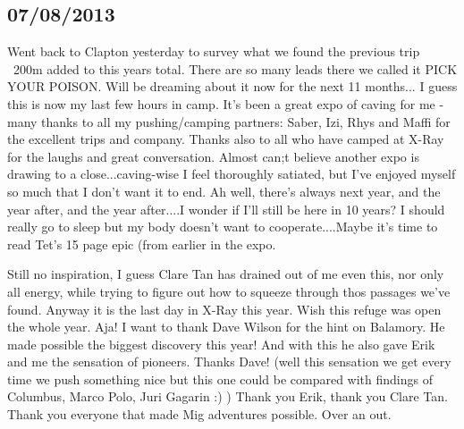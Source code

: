 
\subsection{07/08/2013}
Went back to Clapton yesterday to survey what we found the previous trip ~200m added to this years total. There are so many leads there we called it PICK YOUR POISON. Will be dreaming about it now for the next 11 months...
I guess this is now my last few hours in camp. It’s been a great expo of caving for me - many thanks to all my pushing/camping partners: Saber, Izi, Rhys and Maffi for the excellent trips and company. Thanks also to all who have camped at X-Ray for the laughs and great conversation.
Almost can;t believe another expo is drawing to a close...caving-wise I feel thoroughly satiated, but I’ve enjoyed myself so much that I don’t want it to end. Ah well, there’s always next year, and the year after, and the year after....I wonder if I’ll still be here in 10 years?
I should really go to sleep but my body doesn’t want to cooperate....Maybe it’s time to read Tet’s 15 page epic (from earlier in the expo.


Still no inspiration, I guess Clare Tan has drained out of me even this, nor only all energy, while trying to figure out how to squeeze through thos passages we’ve found. Anyway it is the last day in X-Ray this year. Wish this refuge was open the whole year. Aja! I want to thank Dave Wilson for the hint on Balamory. He made possible the biggest discovery this year! And with this he also gave Erik and me the sensation of pioneers. Thanks Dave! (well this sensation we get every time we push something nice but this one could be compared with findings of Columbus, Marco Polo, Juri Gagarin :) ) Thank you Erik, thank you Clare Tan. Thank you everyone that made Mig adventures possible. Over an out.


